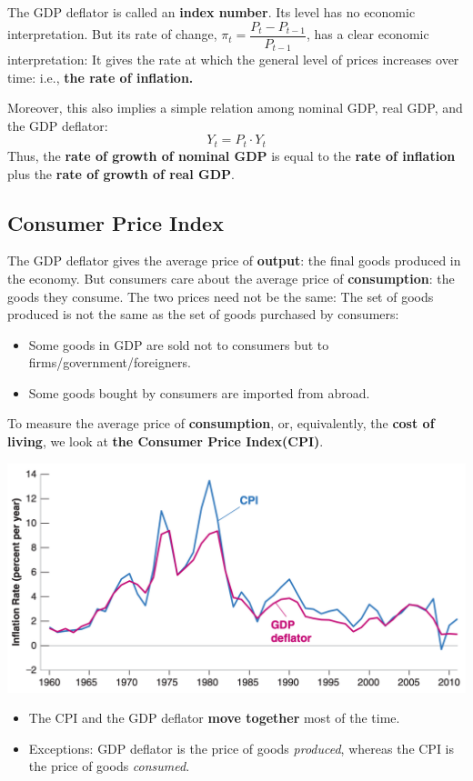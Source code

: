 \documentclass[11pt, a4paper]{ECON2123}
\begin{document}
\begin{spacing}{1.5}
    The GDP deflator is called an {\bf index number}. Its level has no economic 
    interpretation. But its rate of change, $\pi_t=\dfrac{P_t-P_{t-1}}{P_{t-1}}$, 
    has a clear economic interpretation: It gives the rate at which the general 
    level of prices increases over time: i.e., {\bf the rate of inflation.}

    Moreover, this also implies a simple relation among nominal GDP, 
    real GDP, and the GDP deflator:
    $$Y_t = P_t\cdot Y_t$$
    Thus, the {\bf rate of growth of nominal GDP} is equal to the 
    {\bf rate of inflation} plus the {\bf rate of growth of real GDP}.

    \subsection{Consumer Price Index}

    The GDP deflator gives the average price of {\bf output}: the final 
    goods produced in the economy. But consumers care about the average 
    price of {\bf consumption}: the goods they consume. 
    The two prices need not be the same: The set of goods produced 
    is not the same as the set of goods purchased by consumers:
    \begin{itemize}
        \item Some goods in GDP are sold not to consumers but to 
        firms/government/foreigners.
        \item Some goods bought by consumers are imported from abroad.
    \end{itemize}

    To measure the average price of {\bf consumption}, or, equivalently, 
    the {\bf cost of living}, we look at {\bf the Consumer Price Index(CPI)}.
    \begin{center}
        \includegraphics[scale=0.36]{images/0102-cpi-vs-deflator.png}
    \end{center}
    \begin{itemize}
        \item The CPI and the GDP deflator {\bf move together} most of the time.
        \item Exceptions: GDP deflator is the price of goods {\it produced}, 
        whereas the CPI is the price of goods {\it consumed}.
    \end{itemize}


\end{spacing}
\end{document}
